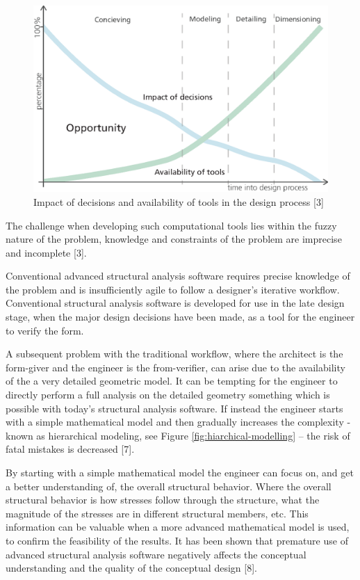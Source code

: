 \begin{figure}
  \includegraphics[width=350pt]{graphics/impact-tools.eps}
  \caption{Impact of decisions and availability of tools in the design process [3]}
  \label{fig:impact-tools}
\end{figure}


The challenge when developing such computational tools lies within the fuzzy nature of the problem, knowledge and constraints of the problem are imprecise and incomplete [3].

Conventional advanced structural analysis software requires precise knowledge of the problem and is insufficiently agile to follow a designer’s iterative workflow. Conventional structural analysis software is developed for use in the late design stage, when the major design decisions have been made, as a tool for the engineer to verify the form. 

A subsequent problem with the traditional workflow, where the architect is the form-giver and the engineer is the from-verifier, can arise due to the availability of the a very detailed geometric model. It can be tempting for the engineer to directly perform a full analysis on the detailed geometry something which is possible with today’s structural analysis software. If instead the engineer starts with a simple mathematical model and then gradually increases the complexity - known as hierarchical modeling, see Figure \ref{fig:hiarchical-modelling} – the risk of fatal mistakes is decreased [7]. 

By starting with a simple mathematical model the engineer can focus on, and get a better understanding of, the overall structural behavior. Where the overall structural behavior is how stresses follow through the structure, what the magnitude of the stresses are in different structural members, etc. This information can be valuable when a more advanced mathematical model is used, to confirm the feasibility of the results. It has been shown that premature use of advanced structural analysis software negatively affects the conceptual understanding and the quality of the conceptual design [8].

